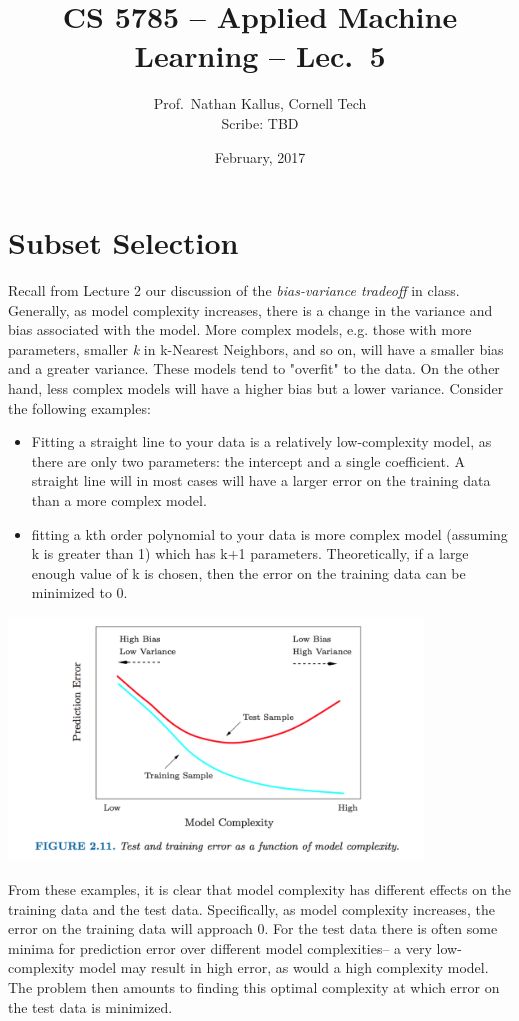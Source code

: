 \documentclass[a4paper]{article}
\title{CS 5785 -- Applied Machine Learning -- Lec.\ 5}
\author{Prof.\ Nathan Kallus, Cornell Tech\\Scribe: TBD}
\date{February, 2017}
\begin{document}
\maketitle

\section{Subset Selection}

Recall from Lecture 2 our discussion of the \emph{bias-variance tradeoff} in class.  Generally, as model complexity increases, there is a change in the variance and bias associated with the model. More complex models, e.g. those with more parameters, smaller \emph{k} in k-Nearest Neighbors, and so on, will have a smaller bias and a greater variance.  These models tend to "overfit" to the data.  On the other hand, less complex models will have a higher bias but a lower variance.  Consider the following examples:
\begin{itemize}
\item Fitting a straight line to your data is a relatively low-complexity model, as there are only two parameters: the intercept and a single coefficient. A straight line will in most cases will have a larger error on the training data than a more complex model.
\item fitting a kth order polynomial to your data is more complex model (assuming k is greater than 1) which has k+1 parameters.  Theoretically, if a large enough value of k is chosen, then the error on the training data can be minimized to 0.
\end{itemize}

\includegraphics[width=11cm]{bias_var_tradeoff.png}

From these examples, it is clear that model complexity has different effects on the training data and the test data.  Specifically, as model complexity increases, the error on the training data will approach 0.  For the test data there is often some minima for prediction error over different model complexities-- a very low-complexity model may result in high error, as would a high complexity model.  The problem then amounts to finding this optimal complexity at which error on the test data is minimized.  
\end{document}
